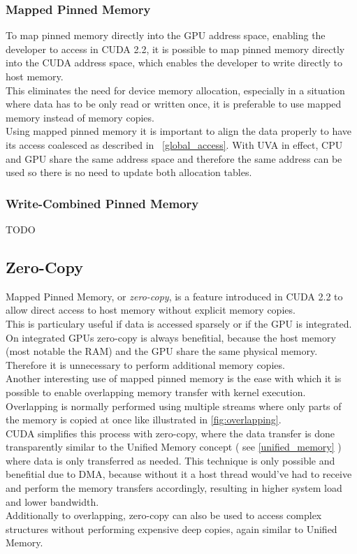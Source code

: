\subsubsection{Mapped Pinned Memory}
To map pinned memory directly into the GPU address space, enabling the developer to access 
in CUDA 2.2, it is possible to map pinned memory directly into the CUDA address space, which enables the developer to write directly to host memory.\\
This eliminates the need for device memory allocation, especially in a situation where data has to be only read or written once, it is preferable to use mapped memory instead of memory copies.\\
Using mapped pinned memory it is important to align the data properly to have its access coalesced as described in ~\ref{global_access}.
With UVA in effect, CPU and GPU share the same address space and therefore the same address can be used so there is no need to update both allocation tables.
\subsubsection{Write-Combined Pinned Memory}
TODO
\subsection{Zero-Copy}
\label{zerocopy}
Mapped Pinned Memory, or \emph{zero-copy},  is a feature introduced in CUDA 2.2 to allow direct access to host memory without explicit memory copies.\\
This is particulary useful if data is accessed sparsely or if the GPU is integrated.\\
On integrated GPUs zero-copy is always benefitial, because the host memory (most notable the RAM) and the GPU share the same physical memory. Therefore it is unnecessary to perform additional memory copies.\\
Another interesting use of mapped pinned memory is the ease with which it is possible to enable overlapping memory transfer with kernel execution.\\
Overlapping is normally performed using multiple streams where only parts of the memory is copied at once like illustrated in \ref{fig:overlapping}.\\
CUDA simplifies this process with zero-copy, where the data transfer is done transparently similar to the Unified Memory concept ( see \ref{unified_memory} ) where data is only transferred as needed.
This technique is only possible and benefitial due to DMA, because without it a host thread would've had to receive and perform the memory transfers accordingly, resulting in higher system load and lower bandwidth.\\
Additionally to overlapping, zero-copy can also be used to access complex structures without performing expensive deep copies, again similar to Unified Memory.\\
